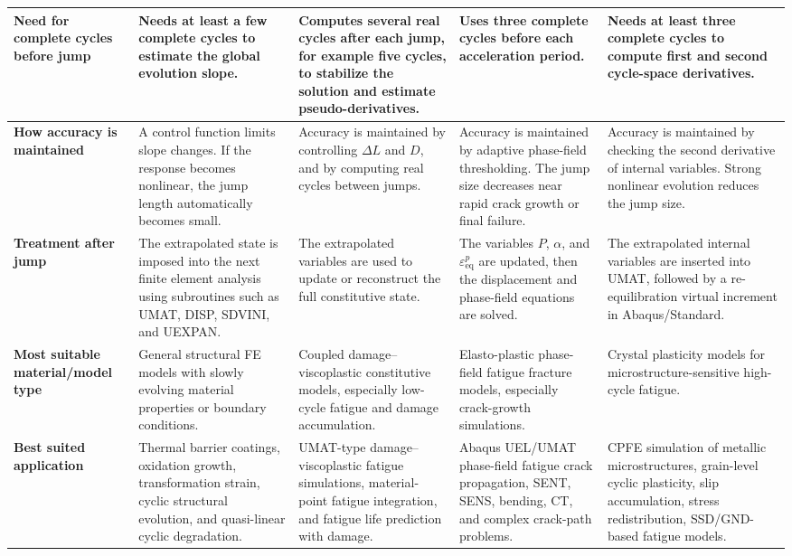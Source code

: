 ﻿\documentclass[11pt,a4paper]{article}
\begin{document}
\begin{landscape}
\begin{table}[htbp]
\begin{tabularx}{\linewidth}{p{3.1cm} Y Y Y Y}
\midrule

\textbf{Need for complete cycles before jump}
&
Needs at least a few complete cycles to estimate the global evolution slope.
&
Computes several real cycles after each jump, for example five cycles, to stabilize the solution and estimate pseudo-derivatives.
&
Uses three complete cycles before each acceleration period.
&
Needs at least three complete cycles to compute first and second cycle-space derivatives.
\\

\midrule

\textbf{How accuracy is maintained}
&
A control function limits slope changes. If the response becomes nonlinear, the jump length automatically becomes small.
&
Accuracy is maintained by controlling $\Delta L$ and $D$, and by computing real cycles between jumps.
&
Accuracy is maintained by adaptive phase-field thresholding. The jump size decreases near rapid crack growth or final failure.
&
Accuracy is maintained by checking the second derivative of internal variables. Strong nonlinear evolution reduces the jump size.
\\

\midrule

\textbf{Treatment after jump}
&
The extrapolated state is imposed into the next finite element analysis using subroutines such as UMAT, DISP, SDVINI, and UEXPAN.
&
The extrapolated variables are used to update or reconstruct the full constitutive state.
&
The variables $P$, $\alpha$, and $\varepsilon_{\mathrm{eq}}^p$ are updated, then the displacement and phase-field equations are solved.
&
The extrapolated internal variables are inserted into UMAT, followed by a re-equilibration virtual increment in Abaqus/Standard.
\\

\midrule

\textbf{Most suitable material/model type}
&
General structural FE models with slowly evolving material properties or boundary conditions.
&
Coupled damage--viscoplastic constitutive models, especially low-cycle fatigue and damage accumulation.
&
Elasto-plastic phase-field fatigue fracture models, especially crack-growth simulations.
&
Crystal plasticity models for microstructure-sensitive high-cycle fatigue.
\\

\midrule

\textbf{Best suited application}
&
Thermal barrier coatings, oxidation growth, transformation strain, cyclic structural evolution, and quasi-linear cyclic degradation.
&
UMAT-type damage--viscoplastic fatigue simulations, material-point fatigue integration, and fatigue life prediction with damage.
&
Abaqus UEL/UMAT phase-field fatigue crack propagation, SENT, SENS, bending, CT, and complex crack-path problems.
&
CPFE simulation of metallic microstructures, grain-level cyclic plasticity, slip accumulation, stress redistribution, SSD/GND-based fatigue models.
\\


\end{tabularx}
\end{table}
\end{landscape}
\end{document}
